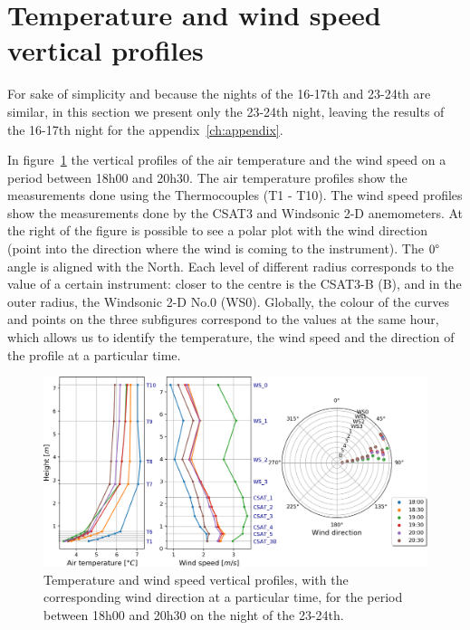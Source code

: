 

\section{Temperature and wind speed vertical profiles}
For sake of simplicity and because the nights of the 16-17th and 23-24th are similar, in this section we present only the 23-24th night, leaving the results of the 16-17th night for the appendix~\ref{ch:appendix}. 


In figure~\ref{fig:18-21_profiles.png} the vertical profiles of the air temperature and the wind speed on a period between 18h00 and 20h30. The air temperature profiles show the measurements done using the Thermocouples (T1 - T10). The wind speed profiles show the measurements done by the CSAT3 and Windsonic 2-D anemometers. At the right of the figure is possible to see a polar plot with the wind direction (point into the direction where the wind is coming to the instrument). The $0 \degree$ angle is aligned with the North. Each level of different radius corresponds to the value of a certain instrument: closer to the centre is the CSAT3-B (B), and in the outer radius, the Windsonic 2-D No.0 (WS0). Globally, the colour of the curves and points on the three subfigures correspond to the values at the same hour, which allows us to identify the temperature, the wind speed and the direction of the profile at a particular time.

\begin{figure}[!ht]
    \centering
    \includegraphics[width=1\textwidth]{fig/chapter_4/23-24/18-21_profiles.png}
    \caption{Temperature and wind speed vertical profiles, with the corresponding wind direction at a particular time, for the period between 18h00 and 20h30 on the night of the 23-24th.}
    \label{fig:18-21_profiles.png}
\end{figure}

